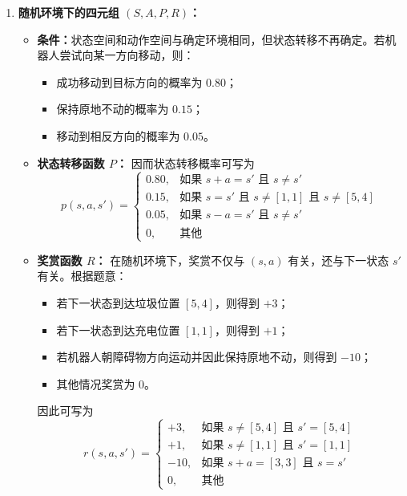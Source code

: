 \documentclass[../main.tex]{subfiles}
\begin{document}
\begin{enumerate}
\begin{enumerate}
{\begin{enumerate}
            \item \textbf{随机环境下的四元组 $(S,A,P,R)$：}
            \begin{itemize}
                \item \textbf{条件：}状态空间和动作空间与确定环境相同，但状态转移不再确定。若机器人尝试向某一方向移动，则：
                \begin{itemize}
                    \item 成功移动到目标方向的概率为 $0.80$；
                    \item 保持原地不动的概率为 $0.15$；
                    \item 移动到相反方向的概率为 $0.05$。
                \end{itemize}
                
                \item \textbf{状态转移函数 $P$：}
                因而状态转移概率可写为
                $$
                p(s,a,s')=
                \begin{cases}
                0.80, & \text{如果 } s+a=s' \text{ 且 } s\neq s' \\
                0.15, & \text{如果 } s=s' \text{ 且 } s\neq [1,1] \text{ 且 } s\neq [5,4] \\
                0.05, & \text{如果 } s-a=s' \text{ 且 } s\neq s' \\
                0, & \text{其他}
                \end{cases}
                $$
                
                \item \textbf{奖赏函数 $R$：}
                在随机环境下，奖赏不仅与 $(s,a)$ 有关，还与下一状态 $s'$ 有关。根据题意：
                \begin{itemize}
                    \item 若下一状态到达垃圾位置 $[5,4]$，则得到 $+3$；
                    \item 若下一状态到达充电位置 $[1,1]$，则得到 $+1$；
                    \item 若机器人朝障碍物方向运动并因此保持原地不动，则得到 $-10$；
                    \item 其他情况奖赏为 $0$。
                \end{itemize}
                因此可写为
                $$
                r(s,a,s')=
                \begin{cases}
                +3, & \text{如果 } s\neq [5,4] \text{ 且 } s'=[5,4] \\
                +1, & \text{如果 } s\neq [1,1] \text{ 且 } s'=[1,1] \\
                -10, & \text{如果 } s+a=[3,3] \text{ 且 } s=s' \\
                0, & \text{其他}
                \end{cases}
                $$
            \end{itemize}
        \end{enumerate}
        }
    \end{enumerate}
\end{enumerate}
\end{document}
